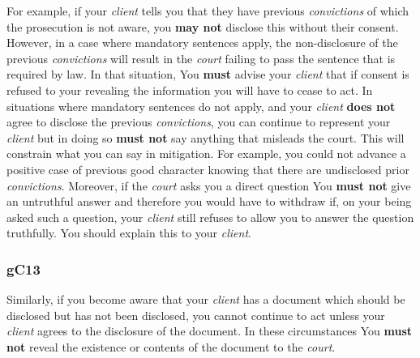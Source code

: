 For example, if your \emph{client} tells you that they have previous
\emph{convictions} of which the prosecution is not aware, you \textcolor{myred}{\textbf{may not}}
disclose this without their consent. However, in a case where mandatory
sentences apply, the non-disclosure of the previous \emph{convictions}
will result in the \emph{court} failing to pass the sentence that is
required by law. In that situation, You \textcolor{myred}{\textbf{must}} advise your \emph{client}
that if consent is refused to your revealing the information you will
have to cease to act. In situations where mandatory sentences do not
apply, and your \emph{client} \textcolor{myred}{\textbf{does not}} agree to disclose the previous
\emph{convictions}, you can continue to represent your \emph{client} but
in doing so \textcolor{myred}{\textbf{must not}} say anything that misleads the court. This will
constrain what you can say in mitigation. For example, you could not
advance a positive case of previous good character knowing that there
are undisclosed prior \emph{convictions}. Moreover, if the \emph{court}
asks you a direct question You \textcolor{myred}{\textbf{must not}} give an untruthful answer and
therefore you would have to withdraw if, on your being asked such a
question, your \emph{client} still refuses to allow you to answer the
question truthfully. You should explain this to your \emph{client}.

\subsubsection{\color{darkgrey}gC13}

Similarly, if you become aware that your \emph{client} has a document
which should be disclosed but has not been disclosed, you cannot
continue to act unless your \emph{client} agrees to the disclosure of
the document. In these circumstances You \textcolor{myred}{\textbf{must not}} reveal the existence
or contents of the document to the \emph{court}.





